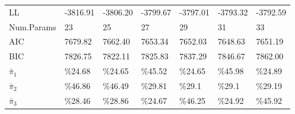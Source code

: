 \begin{tabular}{lllllll}
  LL & -3816.91 & -3806.20 & -3799.67 & -3797.01 & -3793.32 & -3792.59 \\ 
  Num.Params & 23 & 25 & 27 & 29 & 31 & 33 \\ 
  AIC & 7679.82 & 7662.40 & 7653.34 & 7652.03 & 7648.63 & 7651.19 \\ 
  BIC & 7826.75 & 7822.11 & 7825.83 & 7837.29 & 7846.67 & 7862.00 \\ 
  $\bar{\pi}_{1}$ & \%24.68 & \%24.65 & \%45.52 & \%24.65 & \%45.98 & \%24.89 \\ 
  $\bar{\pi}_{2}$ & \%46.86 & \%46.49 & \%29.81 & \%29.1 & \%29.1 & \%29.19 \\ 
  $\bar{\pi}_{3}$ & \%28.46 & \%28.86 & \%24.67 & \%46.25 & \%24.92 & \%45.92 \\ 
   \hline
\end{tabular}

